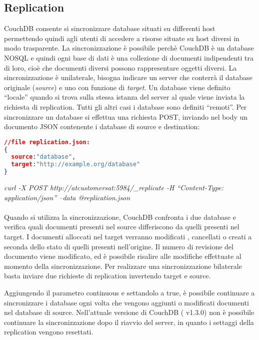 \newpage
\subsection{Replication} 
CouchDB consente si sincronizzare database situati su differenti host
permettendo quindi agli utenti di accedere a risorse situate su host diversi in
modo trasparente.
La sincronizzazione è possibile perchè CouchDB è un database
NOSQL e quindi ogni base di dati è una collezione di documenti indipendenti tra
di loro, cioè che documenti diversi possono rappresentare oggetti
diversi.
La sincronizzazione è unilaterale, bisogna indicare un server che conterrà
il database originale (\emph{source}) e uno con funzione di \emph{target}.
Un database viene definito ``locale'' quando si trova sulla stessa istanza del
server al quale viene inviata la richiesta di replication.
Tutti gli altri casi i database sono definiti ``remoti''.
Per sincronizzare un database si effettua una richiesta POST, inviando nel body
un documento JSON contenente i database di source e destination:

\begin{lstlisting}[language=json]
//file replication.json:
{
  source:"database",
  target:"http://example.org/database"
}
\end{lstlisting}
 
 
\emph{curl -X POST http://atcustomersat:5984/\_replicate -H ``Content-Type:}
\emph{application/json'' --data @replication.json}
\\\\
Quando si utilizza la sincronizzazione, CouchDB confronta i due database e
verifica quali documenti presenti nel source differiscono da quelli presenti nel
target. I documenti alloccati nel target verranno modificati , cancellati o
creati a seconda dello stato di quelli presenti nell'origine. Il numero di
revisione del documento viene modificato, ed è possibile risalire alle modifiche
effettuate al momento della sincronizzazione. Per realizzare una
sincronizzazione bilaterale basta inviare due richieste di replication
invertendo target e source.

Aggiungendo il parametro continuous e settandolo a true, è possibile continuare
a sincronizzare i database ogni volta che vengono aggiunti o modificati
documenti nel database di source. Nell'attuale versione di CouchDB ( v1.3.0) non
è possibile continuare la sincronizzazione dopo il riavvio del server, in quanto
i settaggi della replication vengono resettati.
